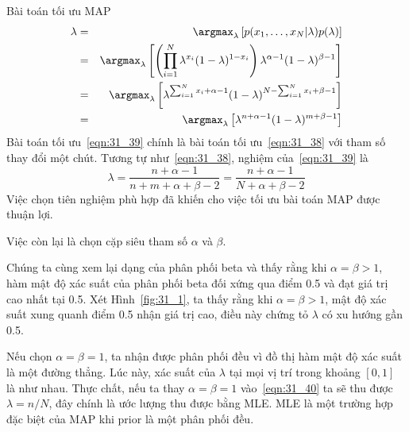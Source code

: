 Bài toán tối ưu MAP
\begin{eqnarray} 
\nonumber
  \lambda & = & \argmax_{\lambda} \left[p(x_1, \dots, x_N | \lambda) p(\lambda) \right] \\\ 
\nonumber
  & = & \argmax_{\lambda} \left[\left(\prod_{i=1}^N \lambda^{x_i} ( 1- \lambda)^{1 - x_i}\right) \lambda^{\alpha - 1} ( 1 - \lambda)^{\beta - 1} \right] \\\ 
\nonumber
  & = & \argmax_{\lambda} \left[ \lambda^{\sum_{i = 1}^N x_i + \alpha - 1} ( 1- \lambda)^{N - \sum_{i=1}^N x_i + \beta - 1} \right] \\\ 
  \label{eqn:31_39}
  & = & \argmax_{\lambda} \left[ \lambda^{n + \alpha - 1} ( 1- \lambda)^{m + \beta - 1} \right] 
\end{eqnarray} 
 Bài toán tối ưu~\eqref{eqn:31_39} chính là bài toán tối ưu~\eqref{eqn:31_38} với
tham số thay đổi một chút. Tương tự như~\eqref{eqn:31_38}, nghiệm
của~\eqref{eqn:31_39} là
\begin{equation} 
\label{eqn:31_40}
\lambda = \frac{n + \alpha - 1}{n + m + \alpha + \beta - 2}= \frac{n + \alpha - 1}{N + \alpha + \beta - 2}
\end{equation} 
Việc chọn tiên nghiệm phù hợp đã khiến cho việc tối ưu bài toán MAP được thuận
lợi.
 
 
Việc còn lại là chọn cặp siêu tham số $\alpha$ và $\beta$. 
 
Chúng ta cùng xem lại dạng của phân phối beta và thấy rằng khi $\alpha
= \beta > 1$, hàm mật độ xác suất của phân phối beta đối xứng qua điểm 0.5 và
đạt giá trị cao nhất tại 0.5. Xét Hình~\ref{fig:31_1}, ta thấy rằng khi
$\alpha =\beta > 1$, mật độ xác suất xung quanh điểm 0.5 nhận giá trị
cao, điều này chứng tỏ $\lambda$ có xu hướng gần 0.5.
 
Nếu chọn $\alpha = \beta = 1$, ta nhận được phân phối đều vì đồ thị hàm mật
độ xác suất là một đường thẳng. Lúc này, xác suất của $\lambda$ tại mọi vị trí
trong khoảng $[0, 1]$ là như nhau. Thực chất, nếu ta thay $\alpha = \beta = 1$
vào~\eqref{eqn:31_40} ta sẽ thu được $\lambda = n/N$, đây chính là ước lượng thu
được bằng MLE. MLE là một trường hợp đặc biệt của MAP khi prior là một phân phối
đều.
 

